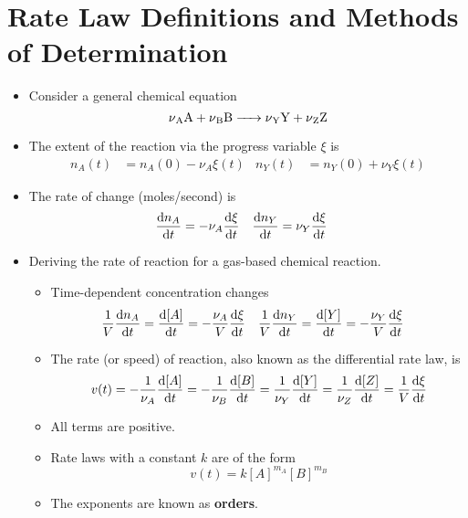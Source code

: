 \documentclass[../notes.tex]{subfiles}
\begin{document}
\section{Rate Law Definitions and Methods of Determination}
\begin{itemize}
    \item {}Consider a general chemical equation
    \begin{equation*}
        \ce{\nu_AA + \nu_BB -> \nu_YY + \nu_ZZ}
    \end{equation*}
    \item The extent of the reaction via the progress variable $\xi$ is
    \begin{align*}
        n_A(t) &= n_A(0)-\nu_A\xi(t)&
        n_Y(t) &= n_Y(0)+\nu_Y\xi(t)
    \end{align*}
    \item The rate of change (moles/second) is
    \begin{align*}
        \dv{n_A}{t} &= -\nu_A\dv{\xi}{t}&
        \dv{n_Y}{t} &= \nu_Y\dv{\xi}{t}
    \end{align*}
    \item Deriving the rate of reaction for a gas-based chemical reaction.
    \begin{itemize}
        \item Time-dependent concentration changes
        \begin{align*}
            \frac{1}{V}\dv{n_A}{t} &= \dv{[A]}{t} = -\frac{\nu_A}{V}\dv{\xi}{t}&
            \frac{1}{V}\dv{n_Y}{t} &= \dv{[Y]}{t} = -\frac{\nu_Y}{V}\dv{\xi}{t}
        \end{align*}
        \item The rate (or speed) of reaction, also known as the differential rate law, is
        \begin{equation*}
            v(t) = -\frac{1}{\nu_A}\dv{[A]}{t}
            = -\frac{1}{\nu_B}\dv{[B]}{t}
            = \frac{1}{\nu_Y}\dv{[Y]}{t}
            = \frac{1}{\nu_Z}\dv{[Z]}{t}
            = \frac{1}{V}\dv{\xi}{t}
        \end{equation*}
        \item All terms are positive.
        \item Rate laws with a constant $k$ are of the form
        \begin{equation*}
            v(t) = k[A]^{m_A}[B]^{m_B}
        \end{equation*}
        \item The exponents are known as \textbf{orders}.

\end{itemize}
\end{itemize}
\end{document}
